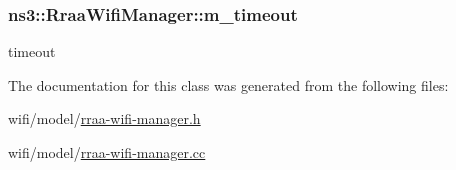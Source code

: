 \subsubsection[{\texorpdfstring{m\+\_\+timeout}{m_timeout}}]{ ns3\+::\+Rraa\+Wifi\+Manager\+::m\+\_\+timeout\hspace{0.3cm}{\ttfamily [private]}}\hypertarget{classns3_1_1RraaWifiManager_aded5168ef9f21eea5a9da48dedb99a7c}{}\label{classns3_1_1RraaWifiManager_aded5168ef9f21eea5a9da48dedb99a7c}


timeout 



The documentation for this class was generated from the following files\+:\begin{DoxyCompactItemize}
\item 
wifi/model/\hyperlink{rraa-wifi-manager_8h}{rraa-\/wifi-\/manager.\+h}\item 
wifi/model/\hyperlink{rraa-wifi-manager_8cc}{rraa-\/wifi-\/manager.\+cc}\end{DoxyCompactItemize}
